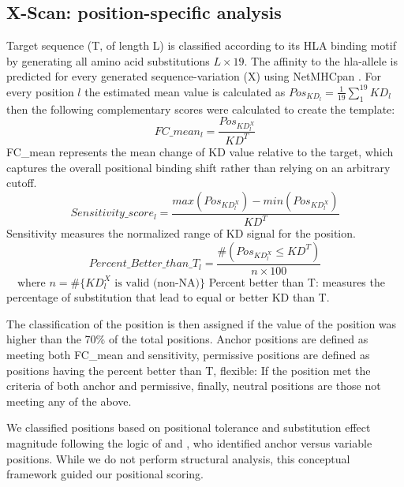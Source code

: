 \documentclass[unnumsec,webpdf,contemporary,large]{oup-authoring-template}%
\theoremstyle{thmstyleone}%
\theoremstyle{thmstyletwo}%
\theoremstyle{thmstylethree}%
\begin{document}
    \subsection{\textbf{X-Scan: position-specific analysis}}\label{xscan}  
        Target sequence (T, of length L) is classified according to its HLA binding motif by generating all amino acid substitutions \(L\times 19\). The affinity to the hla-allele is predicted for every generated sequence-variation (X) using NetMHCpan \cite{reynisson2020netmhcpan}. For every position $l$ the estimated mean value is calculated as $Pos_{KD_{l}} = \frac{1}{19}\sum^{19}_{1}KD_{l}$ then the following complementary scores were calculated to create the template: 
        \begin{equation}
            FC\_mean_l = \frac{Pos_{KD^{X}_{l}}}{KD^{T}}\label{fc_mean}
        \end{equation}
        FC\_mean represents the mean change of KD value relative to the target, which captures the overall positional binding shift rather than relying on an arbitrary cutoff.   
        \begin{equation}
                Sensitivity\_score_l = \frac{max(Pos_{KD^{X}_{l}}) - min(Pos_{KD^{X}_{l}})}{KD^{T}}\label{sens}
        \end{equation}
        Sensitivity measures the normalized range of KD signal for the position.
        \begin{equation}
                Percent\_Better\_than\_T_l = \frac{\#(Pos_{KD^{X}_{l}} \leq KD^{T})}{n \times 100} 
                \label{better_wt}
        \end{equation}
        $\quad \text{where } n = \#\{ KD^{X}_{l} \text{ is valid (non-NA)} \}$ 
        Percent better than T: measures the percentage of substitution that lead to equal or better KD than T.

        The classification of the position is then assigned if the value of the position was higher than the 70\% of the total positions.
        Anchor positions are defined as meeting both FC\_mean and sensitivity, permissive positions are defined as positions having the percent better than T, flexible: If the position met the criteria of both anchor and permissive, finally, neutral positions are those not meeting any of the above.
        
        We classified positions based on positional tolerance and substitution effect magnitude following the logic of \cite{xia2023computational} and \cite{gupta2023hla3db}, who identified anchor versus variable positions. While we do not perform structural analysis, this conceptual framework guided our positional scoring. 
        
\end{document}
